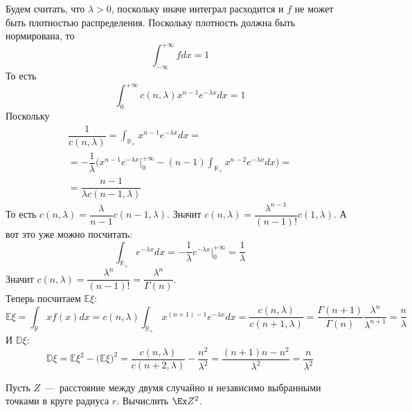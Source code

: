 \begin{solution}
    Будем считать, что $\lambda > 0$, поскольку иначе интеграл расходится и $f$ не может быть плотностью распределения. Поскольку плотность должна быть нормирована, то \[
                                                                                                                                                                            \int_{-\infty}^{+\infty}fdx = 1
    \]
    То есть \[
                \int_0^{+\infty}c(n, \lambda)x^{n - 1}e^{-\lambda x}dx = 1
    \]
    Поскольку
    \begin{multline*}
        \dfrac{1}{c(n, \lambda)} = \int_{\mathbb{R}_+} x^{n - 1}e^{-\lambda x}dx = \\ =  -\dfrac{1}{\lambda}\biggr(x^{n - 1}e^{-\lambda x}\big|^{+\infty}_0 - (n - 1)\int_{\mathbb{R}_+}x^{n - 2}e^{-\lambda x}dx\biggr) = \\ = \dfrac{n - 1}{\lambda c(n - 1, \lambda)}
    \end{multline*}
    То есть $c(n, \lambda) = \dfrac{\lambda}{n - 1}c(n - 1, \lambda)$. Значит $c(n, \lambda) = \dfrac{\lambda^{n - 1}}{(n - 1)!}c(1, \lambda)$. А вот это уже можно посчитать: \[
                                                                                                                                                                                   \int_{\mathbb{R}_+} e^{-\lambda x}dx = -\dfrac{1}{\lambda}e^{-\lambda x}\big|_0^{+\infty} = \dfrac{1}{\lambda}
    \]
    Значит $c(n, \lambda) = \dfrac{\lambda^n}{(n - 1)!} = \dfrac{\lambda^n}{\Gamma(n)}$. \\ Теперь посчитаем $\mathbb{E}\xi$:
    \begin{equation*}
        \mathbb{E}\xi = \int_{\mathbb{R}} xf(x)dx = c(n, \lambda) \int_{\mathbb{R}_+} x^{(n + 1) - 1}e^{-\lambda x}dx = \dfrac{c(n, \lambda)}{c(n + 1, \lambda)} = \dfrac{\Gamma(n + 1)}{\Gamma(n)}\dfrac{\lambda^n}{\lambda^{n + 1}} = \dfrac{n}{\lambda}
    \end{equation*}
    И $\mathbb{D}\xi$:
    \begin{equation*}
        \mathbb{D}\xi = \mathbb{E}\xi^2 - \big(\mathbb{E}\xi\big)^2 = \dfrac{c(n, \lambda)}{c(n + 2, \lambda)} - \dfrac{n^2}{\lambda^2} = \dfrac{(n + 1)n - n^2}{\lambda^2} = \dfrac{n}{\lambda^2}
    \end{equation*}
\end{solution}
\begin{problem}
    Пусть $Z$~---~расстояние между двумя случайно и независимо выбранными точками в круге радиуса $r$.
    Вычислить $\Ex Z^2$.
\end{problem}
